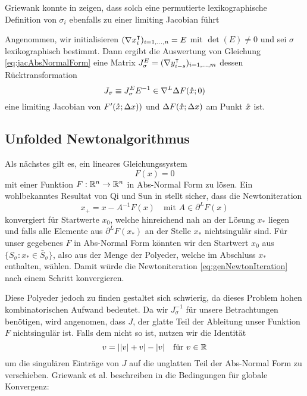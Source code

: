 Griewank konnte in \cite[Prop.8]{monster} zeigen, dass solch eine permutierte lexikographische Definition von $\sigma_i$ ebenfalls zu einer limiting Jacobian führt
\begin{theorem}
Angenommen, wir initialisieren $(\nabla x_i^\intercal)_{i=1,\ldots,n} = E$ mit $\det(E)\neq 0$ und sei $\sigma$ lexikographisch bestimmt. Dann ergibt die Auswertung von Gleichung \eqref{eq:jacAbsNormalForm} eine Matrix $J_\sigma^E = (\nabla y_{i-s}^\intercal)_{i=1,\ldots,m}$ dessen Rücktransformation
\[
 J_\sigma \equiv J_\sigma^E E^{-1} \in \nabla^L \Delta F(\mathring{x};0) 
\]
eine limiting Jacobian von $F'(\mathring{x};\Delta x))$ und $\Delta F(\mathring{x};\Delta x)$ am Punkt $\mathring{x}$ ist.
\end{theorem}





\subsection{Unfolded Newtonalgorithmus}
Als nächstes gilt es, ein lineares Gleichungssystem 
\[
 F(x) = 0
\]
mit einer Funktion  $F:\mathbb{R}^n \to \mathbb{R}^n$ in Abs-Normal Form zu lösen.
Ein wohlbekanntes Resultat von Qi und Sun in \cite{qi1993nonsmooth} stellt sicher, dass die Newtoniteration
\begin{equation}
\label{eq:genNewtonIteration}
 x_+ = x- A^{-1}F(x)\quad \text{mit } A \in \partial^LF(x)
\end{equation}
konvergiert für Startwerte $x_0$, welche hinreichend nah an der Lösung $x_*$ liegen und falls alle Elemente aus $\partial^L F(x_*)$ an der Stelle $x_*$ nichtsingulär sind. 
Für unser gegebenes $F$ in Abs-Normal Form könnten wir den Startwert $x_0$ aus $\lbrace S_\sigma:x_*\in \bar S_\sigma \rbrace$, also aus der Menge der Polyeder, welche im Abschluss  $x_*$ enthalten, wählen. Damit würde die Newtoniteration \eqref{eq:genNewtonIteration} nach einem Schritt konvergieren. 

Diese Polyeder jedoch zu finden gestaltet sich schwierig, da dieses Problem hohen kombinatorischen Aufwand bedeutet. 
Da wir $J_\sigma^{-1}$ für unsere Betrachtungen benötigen, wird angenomen, dass $J$, der glatte Teil der Ableitung unser Funktion $F$ nichtsingulär ist. Falls dem nicht so ist, nutzen wir die Identität
\[
 v = | |v| + v| - |v | \quad \text{für } v\in\mathbb{R}
\]
um die singulären Einträge von $J$ auf die unglatten Teil der Abs-Normal Form zu verschieben.
Griewank et al. beschreiben in \cite[Prop.5.2]{plan} die Bedingungen für globale Konvergenz:

